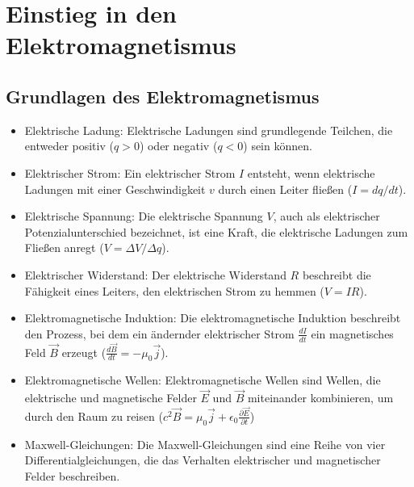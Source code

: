 \documentclass{report}
\begin{document}
\section{Einstieg in den Elektromagnetismus} 
\label{sec:Einstieg in den Elektromagnetismus}

\subsection{Grundlagen des Elektromagnetismus}

\begin{itemize} 
\item Elektrische Ladung: Elektrische Ladungen sind grundlegende Teilchen, die entweder positiv ($q>0$) oder negativ ($q<0$) sein können. 
\item Elektrischer Strom: Ein elektrischer Strom $I$ entsteht, wenn elektrische Ladungen mit einer Geschwindigkeit $v$ durch einen Leiter fließen ($I = dq/dt$). 
\item Elektrische Spannung: Die elektrische Spannung $V$, auch als elektrischer Potenzialunterschied bezeichnet, ist eine Kraft, die elektrische Ladungen zum Fließen anregt ($V = \Delta V/\Delta q$). 
\item Elektrischer Widerstand: Der elektrische Widerstand $R$ beschreibt die Fähigkeit eines Leiters, den elektrischen Strom zu hemmen ($V = IR$). 
\item Elektromagnetische Induktion: Die elektromagnetische Induktion beschreibt den Prozess, bei dem ein ändernder elektrischer Strom $\frac{dI}{dt}$ ein magnetisches Feld $\vec{B}$ erzeugt ($\frac{d\vec{B}}{dt} = -\mu_0\vec{j}$).
\item Elektromagnetische Wellen: Elektromagnetische Wellen sind Wellen, die elektrische und magnetische Felder $\vec{E}$ und $\vec{B}$ miteinander kombinieren, um durch den Raum zu reisen ($c^2\vec{B} = \mu_0\vec{j} + \epsilon_0\frac{\partial\vec{E}}{\partial t}$) \item Maxwell-Gleichungen: Die Maxwell-Gleichungen sind eine Reihe von vier Differentialgleichungen, die das Verhalten elektrischer und magnetischer Felder beschreiben. 
\end{itemize}
\end{document}

